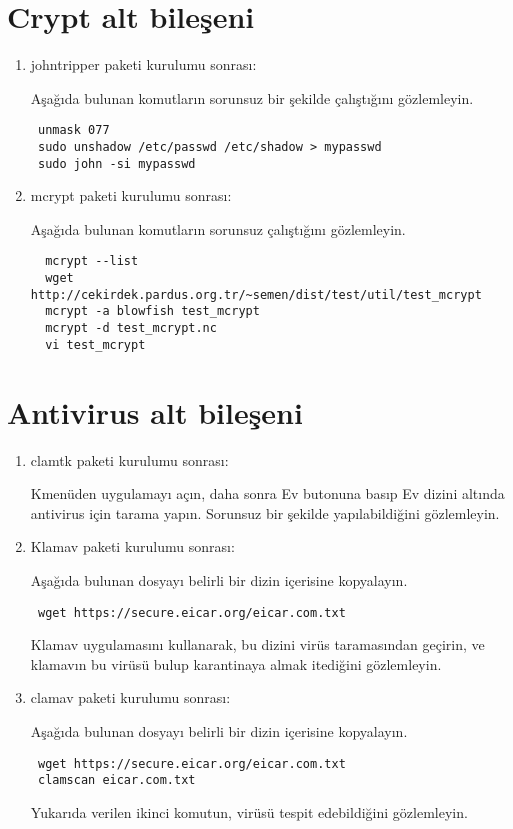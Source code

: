\documentclass[a4paper,10pt]{article}
\begin{document}
\section{Crypt alt bileşeni}
\begin{enumerate}
\item johntripper paketi kurulumu sonrası:

Aşağıda bulunan komutların sorunsuz bir şekilde çalıştığını gözlemleyin.
\begin{verbatim}
 unmask 077
 sudo unshadow /etc/passwd /etc/shadow > mypasswd
 sudo john -si mypasswd 
\end{verbatim}

 \item mcrypt paketi kurulumu sonrası:

Aşağıda bulunan komutların sorunsuz çalıştığını gözlemleyin.
\begin{verbatim}
  mcrypt --list
  wget http://cekirdek.pardus.org.tr/~semen/dist/test/util/test_mcrypt
  mcrypt -a blowfish test_mcrypt
  mcrypt -d test_mcrypt.nc
  vi test_mcrypt
\end{verbatim}


\end{enumerate}


\section{Antivirus alt bileşeni}
\begin{enumerate}
\item clamtk paketi kurulumu sonrası:

Kmenüden uygulamayı açın, daha sonra Ev butonuna basıp Ev dizini altında antivirus için tarama yapın.
Sorunsuz bir şekilde yapılabildiğini gözlemleyin.

\item Klamav paketi kurulumu sonrası:

Aşağıda bulunan dosyayı belirli bir dizin içerisine kopyalayın. 
\begin{verbatim}
 wget https://secure.eicar.org/eicar.com.txt
\end{verbatim}

Klamav uygulamasını kullanarak, bu dizini virüs taramasından geçirin, ve klamavın bu virüsü bulup karantinaya almak itediğini gözlemleyin.

\item clamav paketi kurulumu sonrası:

Aşağıda bulunan dosyayı belirli bir dizin içerisine kopyalayın. 
\begin{verbatim}
 wget https://secure.eicar.org/eicar.com.txt
 clamscan eicar.com.txt
\end{verbatim}

Yukarıda verilen ikinci komutun, virüsü tespit edebildiğini gözlemleyin.

\end{enumerate}
\end{document}
